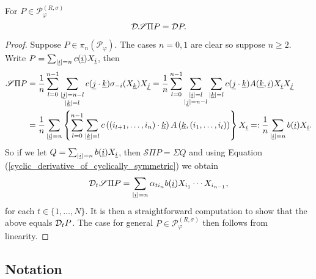 \begin{lem}\label{D_of_S}
For $P\in\mathscr{P}_{\varphi}^{(R,\sigma)}$
	\begin{equation*}
		\mathcal D\mathscr{S}\Pi P=\mathcal D P.
	\end{equation*}
\end{lem}
\begin{proof}
Suppose $P\in \pi_n(\mathscr{P}_\varphi)$. The cases $n=0,1$ are clear so suppose $n\geq 2$. Write $P=\sum_{|\underline{i}|=n} c(\underline{i}) X_{\underline{i}}$, then
	\begin{align*}
		\mathscr{S}\Pi P&=\frac{1}{n}\sum_{l=0}^{n-1} \sum_{\substack{|\underline{j}|=n-l\\ |\underline{k}|=l}}c(\underline{j}\cdot \underline{k})\sigma_{-i}(X_{\underline{k}}) X_{\underline{j}} = \frac{1}{n}\sum_{l=0}^{n-1} \sum_{\substack{|\underline{i}|=l\\ |\underline{j}|=n-l}} \sum_{|\underline{k}|=l} c(\underline{j}\cdot \underline{k}) A(\underline{k},\underline{i}) X_{\underline{i}} X_{\underline{j}}\\
			&=\frac{1}{n}\sum_{|\underline{i}|=n} \left\{ \sum_{l=0}^{n-1}\sum_{|\underline{k}|=l} c\left( (i_{l+1},\ldots, i_{n})\cdot \underline{k}\right) A\left(\underline{k}, (i_1,\ldots, i_l) \right) \right\} X_{\underline{i}} =: \frac{1}{n} \sum_{|\underline{i}|=n} b(\underline{i}) X_{\underline{i}}.
	\end{align*}
So if we let $Q=\sum_{|\underline{i}|=n} b(\underline{i}) X_{\underline{i}}$, then $\mathscr{S}\Pi P=\Sigma Q$ and using Equation (\ref{cyclic_derivative_of_cyclically_symmetric}) we obtain
	\begin{align*}
		\mathcal D_t\mathscr{S}\Pi P=\sum_{|\underline{i}|=n} \alpha_{t i_n} b(\underline{i}) X_{i_1}\cdots X_{i_{n-1}},
	\end{align*}
for each $t\in\{1,\ldots, N\}$. It is then a straightforward computation to show that the above equals $\mathcal D_t P$. The case for general $P\in\mathscr{P}_\varphi^{(R,\sigma)}$ then follows from linearity.
\end{proof}


\subsection{Notation}

